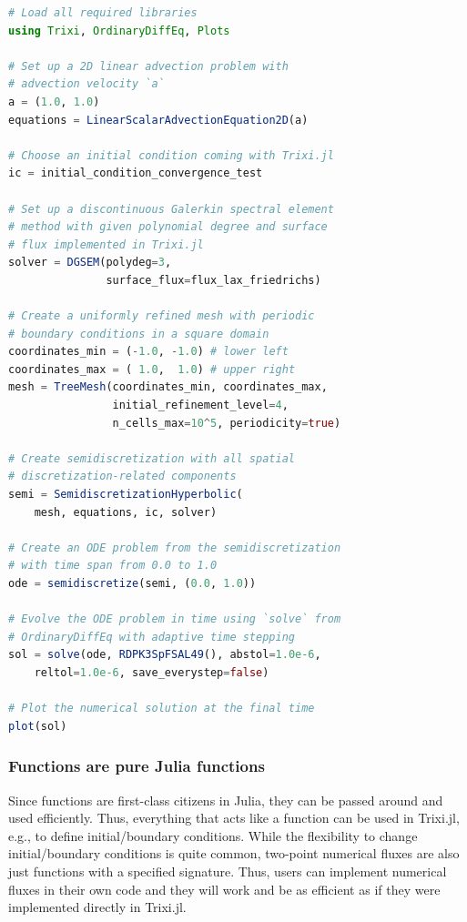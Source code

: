 \documentclass[hidelinks]{juliacon} %
\makeatletter
\newcommand{\eg}[0]{{e.g.\@}\xspace}
\newcommand{\trixi}{Trixi.jl\xspace}
\makeatother
\begin{document}
\begin{lstlisting}[language = Julia]
# Load all required libraries
using Trixi, OrdinaryDiffEq, Plots

# Set up a 2D linear advection problem with
# advection velocity `a`
a = (1.0, 1.0)
equations = LinearScalarAdvectionEquation2D(a)

# Choose an initial condition coming with Trixi.jl
ic = initial_condition_convergence_test

# Set up a discontinuous Galerkin spectral element
# method with given polynomial degree and surface
# flux implemented in Trixi.jl
solver = DGSEM(polydeg=3,
               surface_flux=flux_lax_friedrichs)

# Create a uniformly refined mesh with periodic
# boundary conditions in a square domain
coordinates_min = (-1.0, -1.0) # lower left
coordinates_max = ( 1.0,  1.0) # upper right
mesh = TreeMesh(coordinates_min, coordinates_max,
                initial_refinement_level=4,
                n_cells_max=10^5, periodicity=true)

# Create semidiscretization with all spatial
# discretization-related components
semi = SemidiscretizationHyperbolic(
    mesh, equations, ic, solver)

# Create an ODE problem from the semidiscretization
# with time span from 0.0 to 1.0
ode = semidiscretize(semi, (0.0, 1.0))

# Evolve the ODE problem in time using `solve` from
# OrdinaryDiffEq with adaptive time stepping
sol = solve(ode, RDPK3SpFSAL49(), abstol=1.0e-6,
    reltol=1.0e-6, save_everystep=false)

# Plot the numerical solution at the final time
plot(sol)
\end{lstlisting}

\subsubsection{Functions are pure Julia functions}

Since functions are first-class citizens in Julia, they can be passed around
and used efficiently. Thus, everything that acts like a function can be used
in \trixi, \eg, to define initial/boundary conditions. While the flexibility
to change initial/boundary conditions
is quite common, two-point numerical fluxes are also just functions with a
specified signature. Thus, users can implement numerical fluxes in their
own code and they will work and be as efficient as if they were implemented
directly in \trixi.
\end{document}
